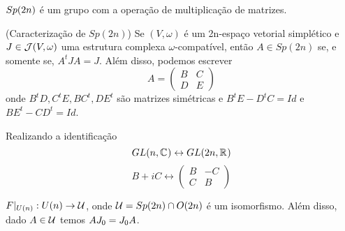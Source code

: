 \documentclass{beamer}
\begin{document}
	\begin{frame}
		\begin{proposicao}
			$Sp(2n)$ é um grupo com a operação de multiplicação de matrizes.
		\end{proposicao}
		
		\begin{lema}
			(Caracterização de $Sp(2n)$) Se $(V, \omega)$ é um 2n-espaço vetorial simplético e $J \in \mathcal{J}(V, \omega)$ uma estrutura complexa $\omega$-compatível, então $A\in Sp(2n)$ se, e somente se, $A^{t}JA = J$. Além disso, podemos escrever 
			$$
			A=
			\left(
			\begin{array}{cc}
			B & C
			\\
			D & E
			\end{array}
			\right)
			$$
			onde $B^{t}D, C^{t}E, BC^{t}, DE^{t} $ são matrizes simétricas e $B^{t}E - D^{t}C = Id$ e $BE^{t} - CD^{t} = Id$.
		\end{lema}
	\end{frame}
	
	\begin{frame}
		Realizando a identificação
		$$
		GL(n, \mathbb{C}^{})\leftrightarrow GL(2n, \mathbb{R}^{})
		$$
		$$
		B+iC \leftrightarrow
		\left(
		\begin{array}{cc}
		B & -C
		\\
		C & B
		\end{array}
		\right)
		$$  
		\begin{lema}
			$F|_{U(n)}: U(n) \to \mathcal{U} $, onde $\mathcal{U}  = Sp(2n)\cap O(2n)$ é um isomorfismo. Além disso, dado $A \in \mathcal{U} $ temos $AJ_{0}=J_{0} A$.
		\end{lema}
	\end{frame}
	
\end{document}
